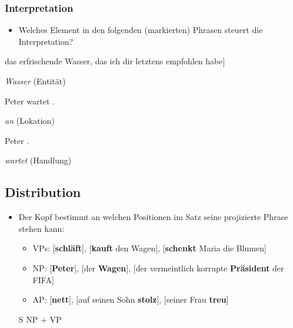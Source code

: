 \begin{frame}
\frametitle{Interpretation}

\begin{itemize}
	\item Welches Element in den folgenden (markierten) Phrasen steuert die Interpretation?
\end{itemize}

\pause 
	
	\ea {[}das erfrischende Wasser, das ich dir letztens empfohlen habe]

\pause
	
	\ras \emph{Wasser} (Entität)

\pause
	\ex Peter wartet .

\pause
	\ras \emph{an} (Lokation)

\pause

	\ex Peter .
	
 \pause

	\ra \emph{wartet} (Handlung)
	
	\z 
	
\end{frame}


\subsection{Distribution}

\begin{frame}

\begin{itemize}
	\item Der Kopf bestimmt an welchen Positionen im Satz seine projizierte Phrase stehen kann:
	\begin{itemize}
		\item VPs: [\textbf{schläft}], [\textbf{kauft} den Wagen], [\textbf{schenkt} Maria die Blumen]
		\item NP: [\textbf{Peter}], [der \textbf{Wagen}], [der vermeintlich korrupte \textbf{Präsident} der FIFA]
		\item AP: [\textbf{nett}], [auf seinen Sohn \textbf{stolz}], [seiner Frau \textbf{treu}]
\end{itemize}
	\pause

\eal S \ras NP + VP
\zl
	
	
\end{itemize}

\end{frame}



